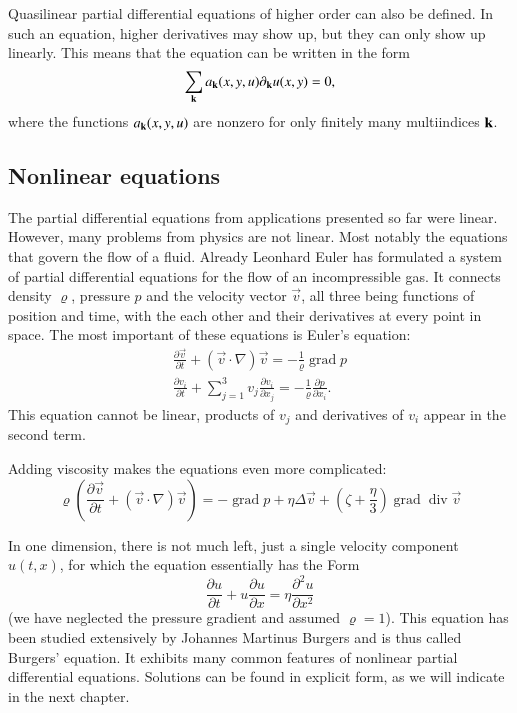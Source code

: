 Quasilinear partial differential equations of higher order can also be
defined.
In such an equation, higher derivatives may show up, but they can only
show up linearly.
This means that the equation can be written in the form
\[
\sum_{\bf k} a_{\bf k}(x,y,u)\partial_{\bf k} u(x,y) = 0,
\]
where the functions $a_{\bf k}(x,y,u)$ are nonzero for only finitely
many multiindices ${\bf k}$.

\subsection{Nonlinear equations
\label{klassifikation:nichtlinear}}
The partial differential equations from applications presented so far
were linear.
However, many problems from physics are not linear.
Most notably the equations that govern the flow of a fluid.
Already Leonhard Euler has formulated a system of partial differential
equations for the flow of an incompressible gas.
It connects density $\varrho$, pressure $p$ and the velocity vector
$\vec{v}$, all three being functions of position and time, with the
each other and their derivatives at every point in space.
The most important of these equations is Euler's equation:
\begin{align*}
\frac{\partial \vec v}{\partial t}
+(\vec v\cdot \nabla)\vec v
=-\frac1{\varrho}\operatorname{grad}p
\\
\frac{\partial v_i}{\partial t}
+\sum_{j=1}^3v_j\frac{\partial v_i}{\partial x_j}
=
-\frac1{\varrho}\frac{\partial p}{\partial x_i}.
\end{align*}
This equation cannot be linear, products of $v_j$ and derivatives of $v_i$
appear in the second term.

Adding viscosity makes the equations even more complicated:
\[
\varrho\left(
\frac{\partial\vec v}{\partial t}
+
(\vec v\cdot\nabla)\vec v
\right)
=
-\operatorname{grad}p+\eta\Delta \vec v+\left(\zeta+\frac{\eta}3\right)
\operatorname{grad}\operatorname{div}\vec v
\]

In one dimension, there is not much left, just a single velocity component
$u(t,x)$, for which the equation essentially has the Form
\[
\frac{\partial u}{\partial t}+u\frac{\partial u}{\partial x}
=\eta\frac{\partial^2u}{\partial x^2}
\]
(we have neglected the pressure gradient and assumed $\varrho=1$).
This equation has been studied extensively by Johannes Martinus Burgers
and is thus called Burgers' equation.
It exhibits many common features of nonlinear partial differential equations.
Solutions can be found in explicit form, as we will indicate in the next
chapter.
